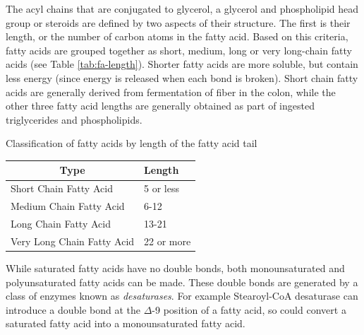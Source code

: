 \documentclass{tufte-handout}
\begin{document}
The acyl chains that are conjugated to glycerol, a glycerol and phospholipid head group or steroids are defined by two aspects of their structure.  The first is their length, or the number of carbon atoms in the fatty acid.  Based on this criteria, fatty acids are grouped together as short, medium, long or very long-chain fatty acids (see Table \ref{tab:fa-length}).  Shorter fatty acids are more soluble, but contain less energy (since energy is released when each bond is broken).  Short chain fatty acids are generally derived from fermentation of fiber in the colon, while the other three fatty acid lengths are generally obtained as part of ingested triglycerides and phospholipids.

\begin{margintable}
\centering
\caption{Classification of fatty acids by length of the fatty acid tail}
\label{tab:fa-length}
\begin{tabular}{ll}
\hline
\multicolumn{1}{c}{\textbf{Type}} & \textbf{Length} \\ \hline
Short Chain Fatty Acid            & 5 or less       \\
Medium Chain Fatty Acid           & 6-12            \\
Long Chain Fatty Acid             & 13-21           \\
Very Long Chain Fatty Acid        & 22 or more     
\end{tabular}
\end{margintable}

  While saturated fatty acids have no double bonds, both monounsaturated and polyunsaturated fatty acids can be made.  These double bonds are generated by a class of enzymes known as \emph{desaturases}.  For example Stearoyl-CoA desaturase can introduce a double bond at the $\Delta$-9 position of a fatty acid, so could convert a saturated fatty acid into a monounsaturated fatty acid.
\end{document}
